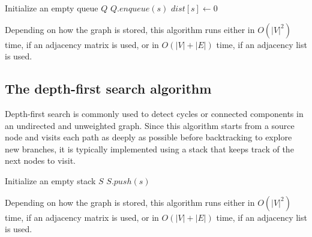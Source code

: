 \documentclass{report}
\begin{document}
\begin{algorithm}[H]
    \caption{The breadth-first algorithm.}

    Initialize an empty queue $\displaystyle Q$\;
    $\displaystyle Q.enqueue(s)$\;
    $\displaystyle dist[s] \gets 0$\;
\end{algorithm}
\noindent Depending on how the graph is stored, this algorithm runs either in $\displaystyle O(|V|^2)$ time, if an adjacency matrix is used, or in $\displaystyle O(|V| + |E|)$ time, if an adjacency list is used.
\subsection{The depth-first search algorithm}
Depth-first search is commonly used to detect cycles or connected components in an undirected and unweighted graph. \newline
Since this algorithm starts from a source node and visits each path as deeply as possible before backtracking to explore new branches, it is typically implemented using a stack that keeps track of the next nodes to visit.

\begin{algorithm}[H]
    \caption{The depth-first algorithm.}

    Initialize an empty stack $\displaystyle S$\;
    $\displaystyle S.push(s)$\;
\end{algorithm}
\noindent Depending on how the graph is stored, this algorithm runs either in $\displaystyle O(|V|^2)$ time, if an adjacency matrix is used, or in $\displaystyle O(|V| + |E|)$ time, if an adjacency list is used.
\end{document}
